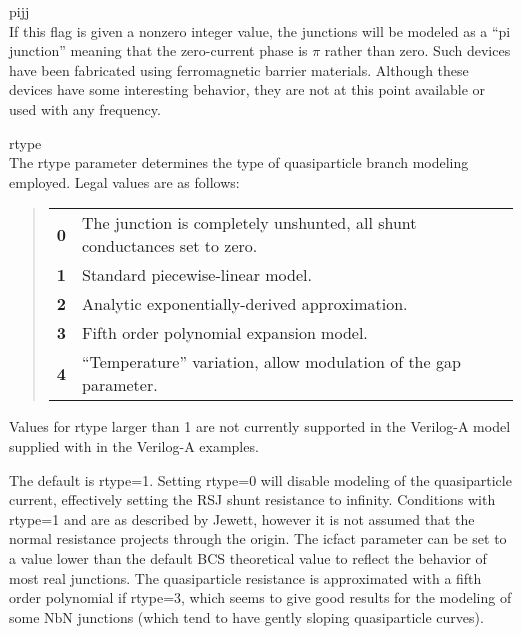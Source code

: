 \begin{description}
\item{\vt pijj}\\
If this flag is given a nonzero integer value, the junctions will be
modeled as a ``pi junction'' meaning that the zero-current phase is
$\pi$ rather than zero.  Such devices have been fabricated using
ferromagnetic barrier materials.  Although these devices have some
interesting behavior, they are not at this point available or used
with any frequency.

\item{\vt rtype}\\
The {\vt rtype} parameter determines the type of quasiparticle branch
modeling employed.  Legal values are as follows:

\begin{quote}
\begin{tabular}{ll}
\bf 0 & The junction is completely unshunted, all shunt conductances
 set to zero.\\
\bf 1 & Standard piecewise-linear model.\\
\bf 2 & Analytic exponentially-derived approximation.\\
\bf 3 & Fifth order polynomial expansion model.\\
\bf 4 & ``Temperature'' variation, allow modulation of the gap parameter.\\
\end{tabular}
\end{quote}

Values for {\vt rtype} larger than 1 are not currently supported in
the Verilog-A model supplied with {\WRspice} in the Verilog-A
examples.

The default is {\vt rtype=1}.  Setting {\vt rtype=0} will disable
modeling of the quasiparticle current, effectively setting the RSJ
shunt resistance to infinity.  Conditions with {\vt rtype=1} and {} are as described by Jewett, however it is not assumed that the
normal resistance projects through the origin.  The {\vt icfact}
parameter can be set to a value lower than the default BCS theoretical
value to reflect the behavior of most real junctions.  The
quasiparticle resistance is approximated with a fifth order polynomial
if {\vt rtype=3}, which seems to give good results for the modeling of
some NbN junctions (which tend to have gently sloping quasiparticle
curves).


\end{description}
